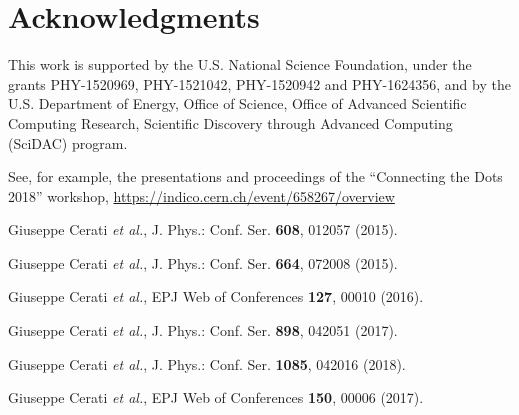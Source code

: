 \documentclass{webofc}
\def\etal{\emph{et al.}\xspace}
\begin{document}
\section{Acknowledgments}

This work is supported by the U.S. National Science Foundation, under the
grants PHY-1520969, PHY-1521042, PHY-1520942 and PHY-1624356,
and by the U.S. Department of Energy, Office of
Science, Office of Advanced Scientific Computing Research, Scientific
Discovery through Advanced Computing (SciDAC) program.


\begin{thebibliography}{}

 See, for example, the presentations and proceedings of the ``Connecting the Dots 2018'' workshop, \url{https://indico.cern.ch/event/658267/overview}

 Giuseppe Cerati \etal, J. Phys.: Conf. Ser. \textbf{608}, 012057 (2015).

 Giuseppe Cerati \etal, J. Phys.: Conf. Ser. \textbf{664}, 072008 (2015).

 Giuseppe Cerati \etal, EPJ Web of Conferences \textbf{127}, 00010 (2016).

 Giuseppe Cerati \etal, J. Phys.: Conf. Ser. \textbf{898}, 042051 (2017).

 Giuseppe Cerati \etal, J. Phys.: Conf. Ser. \textbf{1085}, 042016 (2018).

 Giuseppe Cerati \etal, EPJ Web of Conferences \textbf{150}, 00006 (2017).

  


\end{thebibliography}


\appendix
\end{document}
